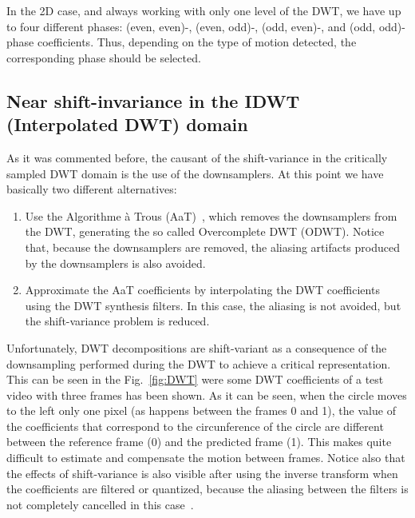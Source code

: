 In the 2D case, and always working with only one level of the DWT, we
have up to four different phases: (even, even)-, (even, odd)-, (odd,
even)-, and (odd, odd)-phase coefficients. Thus, depending on the type
of motion detected, the corresponding phase should be selected.

\subsection{Near shift-invariance in the IDWT (Interpolated DWT) domain}
As it was commented before, the causant of the shift-variance in the
critically sampled DWT domain is the use of the downsamplers. At this
point we have basically two different alternatives:
\begin{enumerate}
\item Use the Algorithme \`a Trous (AaT)~\cite{mallat1999wavelet},
  which removes the downsamplers from the DWT, generating the so
  called Overcomplete DWT (ODWT). Notice that, because the
  downsamplers are removed, the aliasing artifacts produced by the
  downsamplers is also avoided.
\item Approximate the AaT coefficients by interpolating the DWT
  coefficients using the DWT synthesis filters. In this case, the
  aliasing is not avoided, but the shift-variance problem is
  reduced.
\end{enumerate}

Unfortunately, DWT decompositions are shift-variant as a consequence
of the downsampling performed during the DWT to achieve a critical
representation. This can be seen in the Fig.~\ref{fig:DWT} were some
DWT coefficients of a test video with three frames has been shown. As
it can be seen, when the circle moves to the left only one pixel (as
happens between the frames 0 and 1), the value of the coefficients
that correspond to the circunference of the circle are different
between the reference frame (0) and the predicted frame (1). This
makes quite difficult to estimate and compensate the motion between
frames. Notice also that the effects of shift-variance is also visible
after using the inverse transform when the coefficients are filtered
or quantized, because the aliasing between the filters is not
completely cancelled in this case~\cite{bradley2003shift}.

